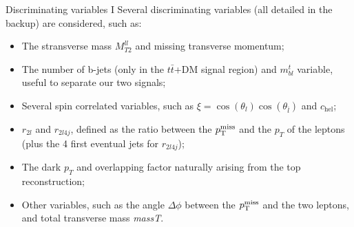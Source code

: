 \documentclass[8pt]{beamer}
\begin{document}
\begin{frame}{Discriminating variables I}
\justifying
\alert{Several discriminating variables} (all detailed in the backup) are considered, such as:
\begin{itemize}
\item The stransverse mass $M_{T2}^{ll}$ and missing transverse momentum;
\item The number of b-jets (only in the $t \bar t$+DM signal region) and $m_{bl}^t$ variable, useful to separate our two signals;
\item Several spin correlated variables, such as $\xi = \cos(\theta_l) \cos(\theta_{\bar l})$ and $c_{\text{hel}}$;
\item $r_{2l}$ and $r_{2l4j}$, defined as the ratio between the $p_{\rm T}^{\rm miss}$ and the $p_T$ of the leptons (plus the 4 first eventual jets for $r_{2l4j}$);
\item The dark $p_T$ and overlapping factor naturally arising from the top reconstruction;
\item Other variables, such as the angle $\Delta \phi$ between the $p_{\rm T}^{\rm miss}$ and the two leptons, and total transverse mass \textit{massT}.
\end{itemize} \vfill

\vspace{10pt}
\begin{table}
\begin{center}
\caption{Ranking of importance of the main variables for the scalar 500 GeV case.}
\end{center}
\end{table} \vfill	
\end{frame}
\end{document}
